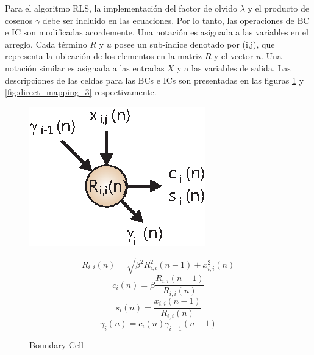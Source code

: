 Para el algoritmo RLS, la implementación del factor de olvido $\lambda$ y el producto de cosenos $\gamma$ debe ser incluido en las ecuaciones. Por lo tanto, las operaciones de BC e IC son modificadas acordemente. Una notación es asignada a las variables en el arreglo. Cada término $R$ y $u$ posee un sub-índice denotado por (i,j), que representa la ubicación de los elementos en la matriz $R$ y el vector $u$. Una notación similar es asignada a las entradas $X$ y a las variables de salida. Las descripciones de las celdas para las BCs e ICs son presentadas en las figuras \ref{fig:direct_mapping_2} y \ref{fig:direct_mapping_3} respectivamente.

\begin{figure}[h!]
        \centering
        \begin{minipage}[b]{0.4\textwidth}
        	\centering
            \includegraphics[width=3 cm]{./figures/C03-bc}
            \caption{Boundary Cell}
            \label{fig:direct_mapping_2}
        \end{minipage}%
		\begin{minipage}[b]{0.6\textwidth}
			\small
			\begin{equation}
			\label{eq:boundary_cell_1}
			R_{i,i}(n) = \sqrt{\beta^2 R_{i,i}^2(n-1) + x^2_{i,i}(n)}
			\end{equation}
			\begin{equation}
			\label{eq:boundary_cell_2}
			c_i(n) = \beta \frac{R_{i,i}(n-1)}{R_{i,i}(n)}
			\end{equation}
			\begin{equation}
			\label{eq:boundary_cell_3}
			s_i(n) = \frac{x_{i,i}(n-1)}{R_{i,i}(n)}
			\end{equation}
			\[ \gamma_i(n) = c_i(n) \gamma_{i-1}(n-1) \]
			\normalsize
		\end{minipage}%
\end{figure}

